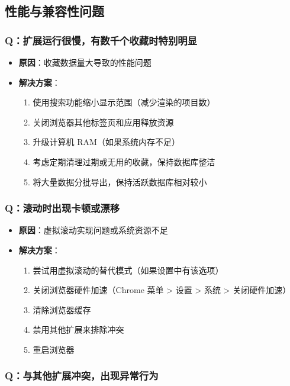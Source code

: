 \documentclass[10pt,a4paper]{article}
\begin{document}
\begin{itemize}
\begin{itemize}
\begin{itemize}
\subsection{性能与兼容性问题}

\subsubsection{Q：扩展运行很慢，有数千个收藏时特别明显}

\begin{itemize}
  \item \textbf{原因}：收藏数据量大导致的性能问题
  \item \textbf{解决方案}：
    \begin{enumerate}
      \item 使用搜索功能缩小显示范围（减少渲染的项目数）
      \item 关闭浏览器其他标签页和应用释放资源
      \item 升级计算机 RAM（如果系统内存不足）
      \item 考虑定期清理过期或无用的收藏，保持数据库整洁
      \item 将大量数据分批导出，保持活跃数据库相对较小
    \end{enumerate}
\end{itemize}

\subsubsection{Q：滚动时出现卡顿或漂移}

\begin{itemize}
  \item \textbf{原因}：虚拟滚动实现问题或系统资源不足
  \item \textbf{解决方案}：
    \begin{enumerate}
      \item 尝试用虚拟滚动的替代模式（如果设置中有该选项）
      \item 关闭浏览器硬件加速（Chrome 菜单 > 设置 > 系统 > 关闭硬件加速）
      \item 清除浏览器缓存
      \item 禁用其他扩展来排除冲突
      \item 重启浏览器
    \end{enumerate}
\end{itemize}

\subsubsection{Q：与其他扩展冲突，出现异常行为}


\end{itemize}
\end{itemize}
\end{itemize}
\end{document}
